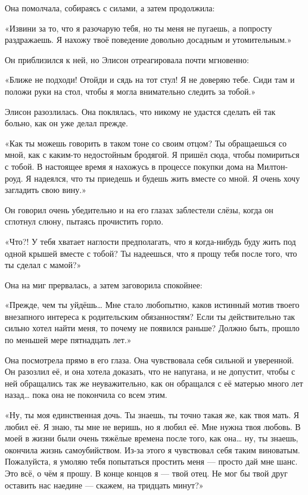 \documentclass[a4paper,12pt]{book}
\begin{document}
\par
Она помолчала, собираясь с силами, а затем продолжила:
\par
«Извини за то, что я разочарую тебя, но ты меня не пугаешь, а попросту раздражаешь. Я нахожу твоё поведение довольно досадным и утомительным.»
\par
Он приблизился к ней, но Элисон отреагировала почти мгновенно:
\par
«Ближе не подходи! Отойди и сядь на тот стул! Я не доверяю тебе. Сиди там и положи руки на стол, чтобы я могла внимательно следить за тобой.»
\par
Элисон разозлилась. Она поклялась, что никому не удастся сделать ей так больно, как он уже делал прежде.
\par
«Как ты можешь говорить в таком тоне со своим отцом? Ты обращаешься со мной, как с каким-то недостойным бродягой. Я пришёл сюда, чтобы помириться с тобой. В настоящее время я нахожусь в процессе покупки дома на Милтон-роуд. Я надеялся, что ты приедешь и будешь жить вместе со мной. Я очень хочу загладить свою вину.»
\par
Он говорил очень убедительно и на его глазах заблестели слёзы, когда он сглотнул слюну, пытаясь прочистить горло.
\par
«Что?! У тебя хватает наглости предполагать, что я когда-нибудь буду жить под одной крышей вместе с тобой? Ты надеешься, что я прощу тебя после того, что ты сделал с мамой?»
\par
Она на миг прервалась, а затем заговорила спокойнее:
\par
«Прежде, чем ты уйдёшь… Мне стало любопытно, каков истинный мотив твоего внезапного интереса к родительским обязанностям? Если ты действительно так сильно хотел найти меня, то почему не появился раньше? Должно быть, прошло по меньшей мере пятнадцать лет.»
\par
Она посмотрела прямо в его глаза. Она чувствовала себя сильной и уверенной. Он разозлил её, и она хотела доказать, что не напугана, и не допустит, чтобы с ней обращались так же неуважительно, как он обращался с её матерью много лет назад… пока она не покончила со всем этим.
\par
«Ну, ты моя единственная дочь. Ты знаешь, ты точно такая же, как твоя мать. Я любил её. Я знаю, ты мне не веришь, но я любил её. Мне нужна твоя любовь. В моей в жизни были очень  тяжёлые времена после того, как она… ну, ты знаешь, окончила жизнь самоубийством. Из-за этого я чувствовал себя таким виноватым. Пожалуйста, я умоляю тебя попытаться простить меня — просто дай мне шанс. Это всё, о чём я прошу. В конце концов я — твой отец. Не мог бы твой друг оставить нас наедине — скажем, на тридцать минут?»
\end{document}

